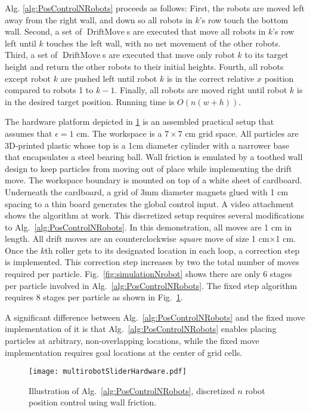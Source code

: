Alg. \ref{alg:PosControlNRobots} proceeds as follows:  
First, the robots are moved left away from the right wall, and down so all robots in $k$'s row touch the bottom wall.
Second, a set of $\operatorname{DriftMove}$s are executed that move all robots in $k$'s row left until $k$ touches the left wall, with no net movement of the other robots.
Third, a set of $\operatorname{DriftMove}$s are executed that move only robot $k$ to its target height and return the other robots to their initial heights. 
Fourth, all robots except robot $k$ are pushed left until robot $k$ is in the correct relative $x$ position compared to robots 1 to $k-1$.
Finally, all robots are moved right until robot $k$ is in the desired target position. Running time is $O(n(w+h))$.



The hardware platform depicted in \ref{fig:construction2d} is an assembled practical setup that assumes that $\epsilon= 1$ cm. 
The workspace is a $7\times 7$ cm grid space. 
All particles are 3D-printed plastic whose top is a 1cm diameter cylinder with a narrower base that encapsulates a steel bearing ball.
Wall friction is emulated by a toothed wall design to keep particles from moving out of place while implementing the drift move. 
The workspace boundary is mounted on top of a white sheet of cardboard.
Underneath the cardboard, a grid of 3mm diameter magnets glued with 1 cm spacing to a thin board generates the global control input.
 A video attachment  shows the algorithm at work. 
This discretized setup requires several modifications to Alg.~\ref{alg:PosControlNRobots}.
 In this demonstration, all moves are 1 cm in length.
   All drift moves are an counterclockwise \emph{square} move  of size 1 cm$\times$1 cm. 
   Once the $k$th roller gets to its designated location in each loop, a correction step is implemented. 
   This correction step increases by two the total number of moves required per particle.
   Fig.~\ref{fig:simulationNrobot} shows there are only 6 stages per particle involved in Alg.~\ref{alg:PosControlNRobots}.
The fixed step algorithm requires 8 stages per particle as shown in Fig.~\ref{fig:construction2d}. 

A significant difference between Alg.~\ref{alg:PosControlNRobots} and the fixed move implementation of it is that Alg.~\ref{alg:PosControlNRobots}
enables placing particles at arbitrary, non-overlapping locations, while the fixed move implementation requires goal locations at the center of grid cells. 

\begin{figure}
\begin{center}
	\texttt{[image: multirobotSliderHardware.pdf]}
\end{center}
\vspace{-1em}
\caption{\label{fig:construction2d}
Illustration of Alg.\ \ref{alg:PosControlNRobots}, discretized $n$ robot position control  using wall friction.
}
\end{figure}

